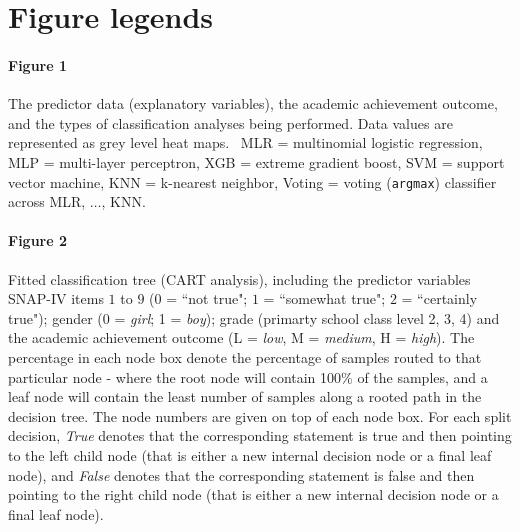\documentclass[10pt,letterpaper]{article}
\begin{document}
{{\vspace{3mm}
\section*{Figure legends}
\paragraph{Figure 1} The predictor data (explanatory variables), the academic achievement outcome, and the types of classification analyses being performed. 
Data values are represented as grey level heat maps. \,
MLR = multinomial logistic regression, MLP = multi-layer perceptron, XGB = extreme gradient boost, SVM = support vector machine, KNN = k-nearest neighbor, 
Voting = voting ({\tt \small argmax}) classifier across MLR, $\ldots$, KNN. \\



\vspace{3mm}

\paragraph{Figure 2} Fitted classification tree (CART analysis),  including the predictor variables SNAP-IV items $1$ to $9$ ($0$ = ``not true"; $1$ = ``somewhat true";
 $2$ = ``certainly true"); gender (0 = \emph{girl}; 1 = \emph{boy}); grade (primarty school class level 2, 3, 4) and the academic achievement outcome (L = \emph{low},  M = \emph{medium}, H = \emph{high}). The percentage in each node box denote the
 percentage of samples routed to that particular node - where the root node will contain 100\% of the samples, and a leaf node will contain the least number of samples along 
 a rooted path in the decision tree.
The node numbers are given on top of each node box. For each split decision, \emph{True} denotes that the corresponding statement is true 
and then pointing to the left child node
(that is either a new internal decision node or a final leaf node), and \emph{False}
denotes that the corresponding statement is false and then pointing to the right child node (that is either a new internal decision node or a final leaf node).  


\vspace{3mm}

}}
\end{document}
